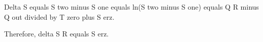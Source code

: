 Delta S equals S two minus S one equals ln(S two minus S one) equals Q R minus Q out divided by T zero plus S erz.  

Therefore, delta S R equals S erz.